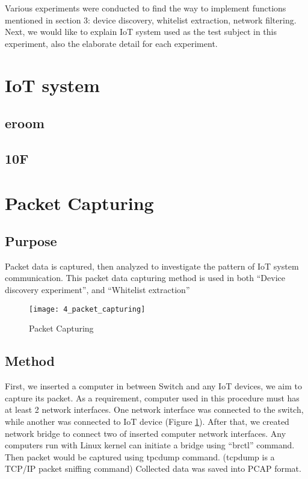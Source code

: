 Various experiments were conducted to find the way to implement functions mentioned in section 3: device discovery, whitelist extraction, network filtering. Next, we would like to explain IoT system used as the test subject in this experiment, also the elaborate detail for each experiment.

\section{IoT system}
\subsection{eroom}
\subsection{10F}

\section{Packet Capturing}
\subsection{Purpose}
Packet data is captured, then analyzed to investigate the pattern of IoT system communication. This packet data capturing method is used in both “Device discovery experiment”, and “Whitelist extraction” 

\begin{figure}[h]
    \centering 
    \texttt{[image: 4\_packet\_capturing]}
    \caption{Packet Capturing}
    \label{fig:s4_packet_capturing}
\end{figure}

\subsection{Method}
First, we inserted a computer in between Switch and any IoT devices, we aim to capture its packet. As a requirement, computer used in this procedure must has at least 2 network interfaces. One network interface was connected to the switch, while another was connected to IoT device (Figure \ref{fig:s4_packet_capturing}). After that, we created network bridge to connect two of inserted computer network interfaces. Any computers run with Linux kernel can initiate a bridge using “brctl” command. Then packet would be captured using tpcdump command. (tcpdump is a TCP/IP packet sniffing command) Collected data was saved into PCAP format. 

